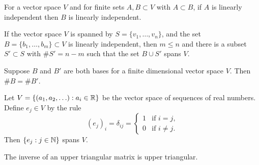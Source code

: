 \documentclass{homework}
\begin{document}
\begin{problem}
  For a vector space $V$ and for finite sets $A, B \subset V$ with
  $A \subset B$, if $A$ is linearly independent then $B$ is linearly
  independent.
\end{problem}

\begin{problem}\label{steinitz-exchange-lemma}If the vector space $V$ is spanned by $S = \{v_1,\ldots,v_n\}$,
  and the set $B = \{b_1,\ldots,b_m \} \subset V$ is linearly
  independent, then $m \leq n$ and there is a subset $S' \subset S$
  with $\# S' = n-m$ such that the set $B \cup S'$ spans $V$.
\end{problem}

\begin{problem}
  Suppose $B$ and $B'$ are both bases for a finite dimensional vector
  space $V$.  Then $\# B = \# B'$.
\end{problem}

\begin{problem}
  Let $V = \{ (a_1,a_2,\ldots) : a_i \in \mathbb{R} \}$ be the vector space of
  sequences of real numbers.  Define $e_j \in V$ by the rule
  \[
    (e_j)_i = \delta_{ij} = \begin{cases}
      1 & \mbox{if $i = j$,} \\
      0 & \mbox{if $i \neq j$.}
    \end{cases}
  \]
  Then $\{ e_j : j \in \mathbb{N} \}$ spans $V$.
\end{problem}

\begin{problem}
  The inverse of an upper triangular matrix is upper triangular.
\end{problem}
\end{document}
